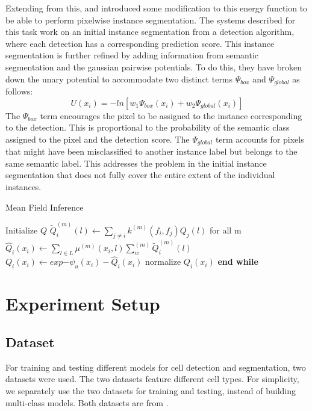 \documentclass[10pt, journal, compsoc]{IEEEtran}
\begin{document}
Extending from this, \cite{Arnab2017PixelwiseIS} and \cite{Li_2018_ECCV} introduced some modification to this energy function to be able to perform  pixelwise instance segmentation. The systems described for this task work on an initial instance segmentation from a detection algorithm, where each detection has a corresponding prediction score. This instance segmentation is further refined by adding information from semantic segmentation and the gaussian pairwise potentials. To do this, they have broken down the unary potential to accommodate two distinct terms $\Psi_{box}$ and $\Psi_{global}$ as follows:
\begin{equation}
U(x_i) = -ln[w_1\Psi_{box}(x_i) + w_2\Psi_{global}(x_i)]
\end{equation}
The $\Psi_{box}$ term encourages the pixel to be assigned to the instance corresponding to the detection. This is proportional to the probability of the semantic class assigned to the pixel and the detection score. The $\Psi_{global}$ term accounts for pixels that might have been misclassified to another instance label but belongs to the same semantic label. This addresses the problem in the initial instance segmentation that does not fully cover the entire extent of the individual instances.
\begin{algorithm*}
\caption{Mean Field Inference}\label{alg:meanfieldinference}
\begin{algorithmic}[1]
\State Initialize $Q$
\State $\widetilde{Q}_i^{(m)}(l)\gets \sum_{j\neq i}k^{(m)}(f_i,f_j)Q_j(l)$ for all m
\State $\hat{Q}_i(x_i)\gets \sum_{l \in L} \mu^{(m)}(x_i,l)\sum_w^{(m)}\widetilde{Q}_i^{(m)}(l)$
\State $Q_i(x_i)\gets exp{-\psi_u(x_i) - \hat{Q}_i(x_i)}$
\State normalize $Q_i(x_i)$
\EndWhile
\State \textbf{end while}
\end{algorithmic}
\end{algorithm*}

\section{Experiment Setup}
\subsection{Dataset}
For training and testing different models for cell detection and segmentation, two datasets were used. The two datasets feature different cell types. For simplicity, we separately use the two datasets for training and testing, instead of building multi-class models. Both datasets are from \cite{waithe_dominic_2019_2632769}.
\end{document}
